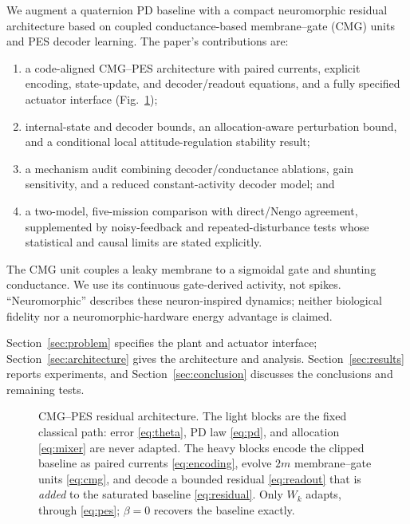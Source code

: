 \documentclass[letterpaper, 10 pt, conference]{ieeeconf}
\begin{document}
We augment a quaternion PD baseline with a compact neuromorphic residual architecture based on coupled conductance-based membrane--gate (CMG) units and PES decoder learning. The paper's contributions are:
\begin{enumerate}
    \item a code-aligned CMG--PES architecture with paired currents, explicit encoding, state-update, and decoder/readout equations, and a fully specified actuator interface (Fig.~\ref{fig:arch});
    \item internal-state and decoder bounds, an allocation-aware perturbation bound, and a conditional local attitude-regulation stability result;
    \item a mechanism audit combining decoder/conductance ablations, gain sensitivity, and a reduced constant-activity decoder model; and
    \item a two-model, five-mission comparison with direct/Nengo agreement, supplemented by noisy-feedback and repeated-disturbance tests whose statistical and causal limits are stated explicitly.
\end{enumerate}

The CMG unit couples a leaky membrane to a sigmoidal gate and shunting conductance. We use its continuous gate-derived activity, not spikes. ``Neuromorphic'' describes these neuron-inspired dynamics; neither biological fidelity nor a neuromorphic-hardware energy advantage is claimed.

Section~\ref{sec:problem} specifies the plant and actuator interface; Section~\ref{sec:architecture} gives the architecture and analysis. Section~\ref{sec:results} reports experiments, and Section~\ref{sec:conclusion} discusses the conclusions and remaining tests.

\begin{figure}[t]

\centering
\resizebox{\textwidth}{!}{}
\caption{CMG--PES residual architecture. The light blocks are the fixed
classical path: error \eqref{eq:theta}, PD law \eqref{eq:pd}, and
allocation \eqref{eq:mixer} are never adapted. The heavy blocks encode the
clipped baseline as paired currents \eqref{eq:encoding}, evolve $2m$
membrane--gate units \eqref{eq:cmg}, and decode a bounded residual
\eqref{eq:readout} that is \emph{added} to the saturated baseline
\eqref{eq:residual}. Only $W_k$ adapts, through \eqref{eq:pes}; $\beta=0$
recovers the baseline exactly.}
\label{fig:arch}
\end{figure}
\end{document}
